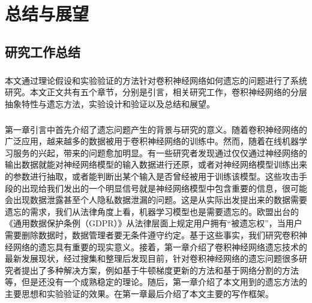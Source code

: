 
\chapter{总结与展望}

\section{研究工作总结}
\paragraph{}本文通过理论假设和实验验证的方法针对卷积神经网络如何遗忘的问题进行了系统研究。本文正文共有五个章节，分别是引言，相关研究工作，卷积神经网络的分层抽象特性与遗忘方法，实验设计和验证以及总结和展望。
\paragraph{}第一章引言中首先介绍了遗忘问题产生的背景与研究的意义。随着卷积神经网络的广泛应用，越来越多的数据被用于卷积神经网络的训练中。然而，随着在线机器学习服务的兴起，带来的问题愈加明显。有一些研究者发现通过仅仅通过神经网络的输出数据就能对神经网络模型的输入数据进行还原，或者对神经网络模型训练出来的参数进行抽取，或者能判断出某个输入是否曾经被用于训练该模型。这些攻击手段的出现给我们发出的一个明显信号就是神经网络模型中包含重要的信息，很可能会出现数据泄露甚至个人隐私数据泄漏的问题。这是从实际出发提出来的数据需要遗忘的需求，我们从法律角度上看，机器学习模型也是需要遗忘的。欧盟出台的《通用数据保护条例（GDPR）》从法律层面上规定用户拥有“被遗忘权”，当用户需要删除数据时，数据管理者要无条件遵守约定。基于这些事实，我们研究卷积神经网络的遗忘具有重要的现实意义。接着，第一章介绍了卷积神经网络遗忘技术的最新发展现状，经过搜集和整理后发现目前，针对卷积神经网络的遗忘问题很多研究者提出了多种解决方案，例如基于牛顿梯度更新的方法和基于网络分割的方法等，但是还没有一个成熟稳定的理论。随后，第一章介绍了本文用到的遗忘方法的主要思想和实验验证的效果。在第一章最后介绍了本文主要的写作框架。
